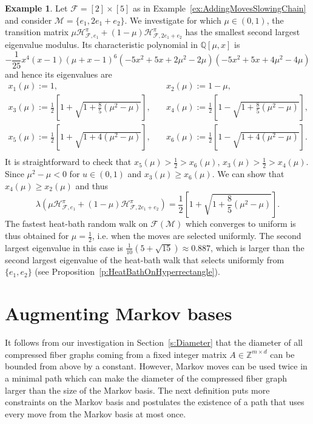 \documentclass[11pt]{amsart}
\theoremstyle{definition}
\newtheorem{example}[thm]{Example}
\numberwithin{equation}{section}
\newcommand{\ring}[1]{\ensuremath{\mathbb{#1}}}
\renewcommand{\>}{\rangle}
\newcommand{\<}{\langle}
\newcommand{\0}{\mathbf{0}}
\newcommand{\1}{\mathbf{1}}
\newcommand{\2}{\mathbf{2}}
\newcommand\QQ{\ring{Q}}
\newcommand\ZZ{\ring{Z}}
\newcommand\cF{{\mathcal F}}
\newcommand\cM{{\mathcal M}}
\newcommand{\heatbathmove}[3]{\mathcal{H}^{#1}_{#2,#3}}
\begin{document}
\begin{example}\label{ex:SolvingSLEMOpti}
Let $\cF=[2]\times[5]$ as in Example~\ref{ex:AddingMovesSlowingChain}
and consider $\cM=\{e_1,2e_1+e_2\}$.
We investigate for which $\mu\in(0,1)$, the transition matrix
$\mu\heatbathmove{\pi}{\cF}{e_1}+(1-\mu)\heatbathmove{\pi}{\cF}{2e_1+e_2}$ has the
smallest second largest eigenvalue modulus. Its characteristic polynomial in $\QQ[\mu,x]$ is
$$-\frac{1}{25}x^4(x-1)(\mu+x-1)^6(-5x^2+5x+2\mu^2-2\mu)(-5x^2+5x+4\mu^2-4\mu)$$
and hence its eigenvalues are 
\begin{equation*}
\begin{split}
x_1(\mu):=1,& \quad x_2(\mu):=1-\mu,\\
x_3(\mu):=\frac{1}{2}\left[1+\sqrt{1+\frac{8}{5}(\mu^2-\mu)}\right],
&\quad
x_4(\mu):=\frac{1}{2}\left[1-\sqrt{1+\frac{8}{5}(\mu^2-\mu)}\right],\\
x_5(\mu):=\frac{1}{2}\left[1+\sqrt{1+4(\mu^2-\mu)}\right],&\quad
x_6(\mu):=\frac{1}{2}\left[1-\sqrt{1+4(\mu^2-\mu)}\right].\\
\end{split}
\end{equation*}
It is straightforward to check that $x_5(\mu)>\frac{1}{2}> x_6(\mu)$, $x_3(\mu)>\frac{1}{2}>
x_4(\mu)$. Since $\mu^2-\mu<0$ for $u\in(0,1)$ and 
$x_3(\mu)\ge x_6(\mu)$. We can show that
$x_4(\mu)\ge x_2(\mu)$ and thus
\begin{equation*}
\lambda(\mu\heatbathmove{\pi}{\cF}{e_1}+(1-\mu)\heatbathmove{\pi}{\cF}{2e_1+e_2})=\frac{1}{2}\left[1+\sqrt{1+\frac{8}{5}(\mu^2-\mu)}\right].
\end{equation*}
The fastest heat-bath random walk on $\cF(\cM)$ which converges to
uniform is thus obtained for
$\mu=\frac{1}{2}$, i.e. when the moves are selected uniformly. The
second largest eigenvalue in this case is
$\frac{1}{10}(5+\sqrt{15})\approx 0.887$, which is larger than the
second largest eigenvalue of the heat-bath walk that selects uniformly
from $\{e_1,e_2\}$ (see Proposition~\ref{p:HeatBathOnHyperrectangle}).
\end{example}

\section{Augmenting Markov bases}

It follows from our investigation in Section~\ref{s:Diameter} that the
diameter of all compressed fiber graphs coming from a fixed integer matrix
$A\in\ZZ^{m\times d}$ can be bounded from above by a constant.
However, Markov moves can be used twice in a minimal path which can
make the diameter of the compressed fiber graph larger than the size
of the Markov basis. The next definition puts more constraints on the
Markov basis and postulates the existence of a path that uses every
move from the Markov basis at most once.
\end{document}
